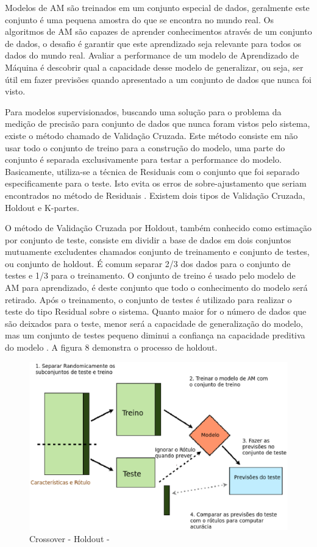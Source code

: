 Modelos de AM são treinados em um conjunto especial de dados, geralmente este conjunto é uma pequena amostra do que se encontra no mundo real. Os algoritmos de AM são capazes de aprender conhecimentos através de um conjunto de dados, o desafio é garantir que este aprendizado seja relevante para todos os dados do mundo real. Avaliar a performance de um modelo de Aprendizado de Máquina é descobrir qual a capacidade desse modelo de generalizar, ou seja, ser útil em fazer previsões quando apresentado a um conjunto de dados que nunca foi visto.

Para modelos supervisionados, buscando uma solução para o problema da medição de precisão para conjunto de dados que nunca foram vistos pelo sistema, existe o método chamado de Validação Cruzada. Este método consiste em não usar todo o conjunto de treino para a construção do modelo, uma parte do conjunto é separada exclusivamente para testar a performance do modelo. Basicamente, utiliza-se a técnica de Residuais com o conjunto que foi separado especificamente para o teste. Isto evita os erros de sobre-ajustamento que seriam encontrados no método de Residuais \cite{jeff1997b}. Existem dois tipos de Validação Cruzada, Holdout e K-partes. 

O método de Validação Cruzada por Holdout, também conhecido como estimação por conjunto de teste, consiste em dividir a base de dados em dois conjuntos mutuamente excludentes chamados conjunto de treinamento e conjunto de testes, ou conjunto de holdout. É comum separar 2/3 dos dados para o conjunto de testes e 1/3 para o treinamento. O conjunto de treino é usado pelo modelo de AM para aprendizado, é deste conjunto que todo o conhecimento do modelo será retirado. Após o treinamento, o conjunto de testes é utilizado para realizar o teste do tipo Residual sobre o sistema. Quanto maior for o número de dados que são deixados para o teste, menor será a capacidade de generalização do modelo, mas um conjunto de testes pequeno diminui a confiança na capacidade preditiva do modelo \cite{astudy1995}. A figura 8 demonstra o processo de holdout.

\begin{figure}[!h]
\centering
\includegraphics[keepaspectratio=true,scale=0.70]
{figuras/holdout.eps}
\caption{Crossover - Holdout - \cite{real2013}}
\label{over}
\end{figure}

